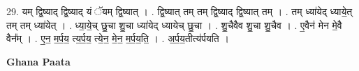 \documentclass[17pt]{extarticle}
\begin{document}
29. यम् द्वि॒ष्याद् द्वि॒ष्याद् यं ॅयम् द्वि॒ष्यात् । . द्वि॒ष्यात् तम् तम् द्वि॒ष्याद् द्वि॒ष्यात् तम् । . तम् ध्या॑येद् ध्याये॒त् तम् तम् ध्या॑येत् । . ध्या॒ये॒च् छु॒चा शु॒चा ध्या॑येद् ध्यायेच् छु॒चा । . शु॒चैवैव शु॒चा शु॒चैव । . ए॒वैन॑ मेन मे॒वै वैन᳚म् । . ए॒न॒ म॒र्प॒य॒ त्य॒र्प॒य॒ त्ये॒न॒ मे॒न॒ म॒र्प॒य॒ति॒ । . अ॒र्प॒य॒तीत्य॑र्पयति । \newline

\textbf{Ghana Paata } \newline
\end{document}
